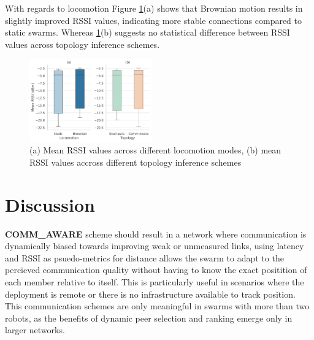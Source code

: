 \documentclass[conference]{IEEEtran}
\begin{document}
With regards to locomotion Figure \ref{fig:rssi}(a) shows that Brownian motion results in slightly improved RSSI values, indicating more stable connections compared to static swarms. Whereas \ref{fig:rssi}(b) suggests no statistical difference between RSSI values across topology inference schemes.

\begin{figure}[h]
    \centering
    \includegraphics[width=0.47\textwidth]{speed_impact.pdf}
    \caption{(a) Mean RSSI values across different locomotion modes, (b) mean RSSI values accross different topology inference schemes}
    \label{fig:rssi}
\end{figure}




\section{Discussion}





\textbf{COMM\_AWARE} scheme should result in a network where communication is dynamically biased towards improving weak or unmeasured links, using latency and RSSI as psuedo-metrics for distance allows the swarm to adapt to the percieved communication quality without having to know the exact positition of each member relative to itself. This is particularly useful in scenarios where the deployment is remote or there is no infrastructure available to track position. This communication schemes are only meaningful in swarms with more than two robots, as the benefits of dynamic peer selection and ranking emerge only in larger networks. \\
\end{document}
